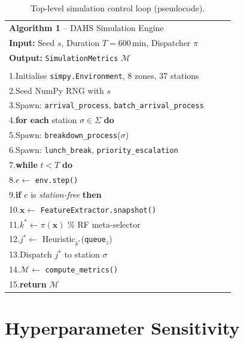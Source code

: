 \documentclass[3p,times]{elsarticle}
\begin{document}
\begin{table}[htbp]
\centering
\caption{Top-level simulation control loop (pseudocode).}
\label{tab:algo}
\begin{tabular}{p{0.90\linewidth}}
\hline
\textbf{Algorithm 1} -- DAHS Simulation Engine \\[2pt]
\textbf{Input:} Seed $s$, Duration $T{=}600$\,min,
  Dispatcher $\pi$ \\
\textbf{Output:} \texttt{SimulationMetrics} $\mathcal{M}$ \\
\hline\\[-6pt]
1.\quad Initialise \texttt{simpy.Environment}, 8 zones, 37 stations\\
2.\quad Seed NumPy RNG with $s$\\
3.\quad Spawn: \texttt{arrival\_process},
              \texttt{batch\_arrival\_process}\\
4.\quad \textbf{for each} station $\sigma\in\Sigma$ \textbf{do}\\
5.\quad\quad Spawn: \texttt{breakdown\_process}($\sigma$)\\
6.\quad Spawn: \texttt{lunch\_break}, \texttt{priority\_escalation}\\
7.\quad \textbf{while} $t < T$ \textbf{do}\\
8.\quad\quad $e \leftarrow$ \texttt{env.step()}\\
9.\quad\quad \textbf{if} $e$ is \textit{station-free} \textbf{then}\\
10.\quad\quad\quad $\bm{x} \leftarrow$
              \texttt{FeatureExtractor.snapshot()}\\
11.\quad\quad\quad $k^{*} \leftarrow \pi(\bm{x})$
              \quad\% RF meta-selector\\
12.\quad\quad\quad $j^{*} \leftarrow$
              Heuristic$_{k^{*}}$(\texttt{queue}$_{z}$)\\
13.\quad\quad\quad Dispatch $j^{*}$ to station $\sigma$\\
14.\quad $\mathcal{M} \leftarrow$ \texttt{compute\_metrics()}\\
15.\quad \textbf{return} $\mathcal{M}$\\[2pt]
\hline
\end{tabular}
\end{table}

\section{Hyperparameter Sensitivity}
\label{app:hp}
\end{document}
